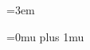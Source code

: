 \sloppy
\emergencystretch=3em
\usepackage{newunicodechar}
\usepackage{xurl}
\Urlmuskip=0mu plus 1mu
\setlength{\footskip}{0.5in}
\pagestyle{empty}
